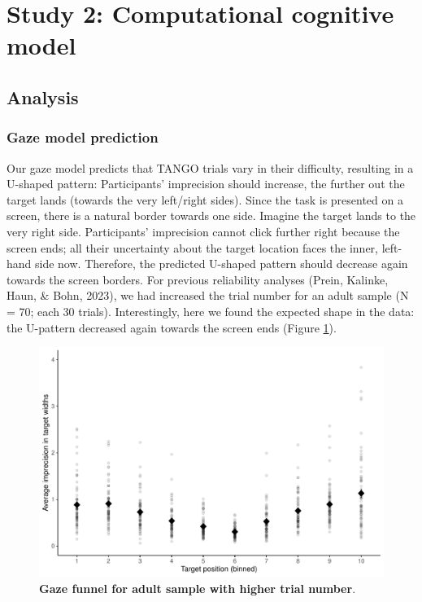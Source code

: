 \documentclass[
  man,floatsintext]{apa7}
\begin{document}
\hypertarget{study-2-computational-cognitive-model}{%
\section{Study 2: Computational cognitive model}\label{study-2-computational-cognitive-model}}

\hypertarget{analysis-1}{%
\subsection{Analysis}\label{analysis-1}}

\hypertarget{gaze-model-prediction}{%
\subsubsection{Gaze model prediction}\label{gaze-model-prediction}}

Our gaze model predicts that TANGO trials vary in their difficulty, resulting in a U-shaped pattern: Participants' imprecision should increase, the further out the target lands (towards the very left/right sides). Since the task is presented on a screen, there is a natural border towards one side. Imagine the target lands to the very right side. Participants' imprecision cannot click further right because the screen ends; all their uncertainty about the target location faces the inner, left-hand side now. Therefore, the predicted U-shaped pattern should decrease again towards the screen borders. For previous reliability analyses (Prein, Kalinke, Haun, \& Bohn, 2023), we had increased the trial number for an adult sample (N = 70; each 30 trials). Interestingly, here we found the expected shape in the data: the U-pattern decreased again towards the screen ends (Figure \ref{fig:fig2}).



\begin{figure}[H]

{\centering \includegraphics[width=1\linewidth]{../figures/gazefunnel_adults} 

}

\caption{\textbf{Gaze funnel for adult sample with higher trial number}.}\label{fig:fig2}
\end{figure}
\end{document}
